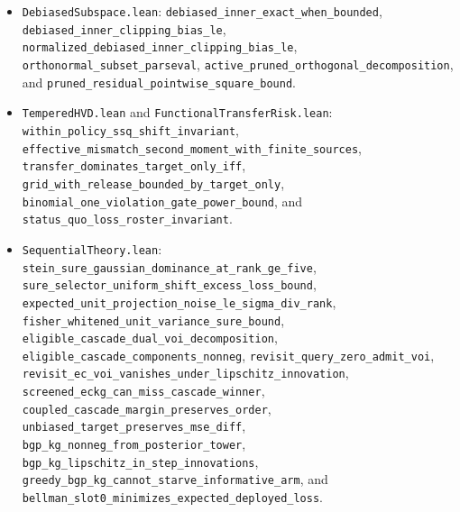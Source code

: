 {\sloppy
\begin{itemize}
  \item \texttt{DebiasedSubspace.lean}: \texttt{debiased\_\allowbreak inner\_\allowbreak exact\_\allowbreak when\_\allowbreak bounded}, \texttt{debiased\_\allowbreak inner\_\allowbreak clipping\_\allowbreak bias\_\allowbreak le}, \texttt{normalized\_\allowbreak debiased\_\allowbreak inner\_\allowbreak clipping\_\allowbreak bias\_\allowbreak le}, \texttt{orthonormal\_\allowbreak subset\_\allowbreak parseval}, \texttt{active\_\allowbreak pruned\_\allowbreak orthogonal\_\allowbreak decomposition}, and \texttt{pruned\_\allowbreak residual\_\allowbreak pointwise\_\allowbreak square\_\allowbreak bound}.
  \item \texttt{TemperedHVD.lean} and \texttt{FunctionalTransferRisk.lean}: \texttt{within\_\allowbreak policy\_\allowbreak ssq\_\allowbreak shift\_\allowbreak invariant}, \texttt{effective\_\allowbreak mismatch\_\allowbreak second\_\allowbreak moment\_\allowbreak with\_\allowbreak finite\_\allowbreak sources}, \texttt{transfer\_\allowbreak dominates\_\allowbreak target\_\allowbreak only\_\allowbreak iff}, \texttt{grid\_\allowbreak with\_\allowbreak release\_\allowbreak bounded\_\allowbreak by\_\allowbreak target\_\allowbreak only}, \texttt{binomial\_\allowbreak one\_\allowbreak violation\_\allowbreak gate\_\allowbreak power\_\allowbreak bound}, and \texttt{status\_\allowbreak quo\_\allowbreak loss\_\allowbreak roster\_\allowbreak invariant}.
  \item \texttt{SequentialTheory.lean}: \texttt{stein\_\allowbreak sure\_\allowbreak gaussian\_\allowbreak dominance\_\allowbreak at\_\allowbreak rank\_\allowbreak ge\_\allowbreak five}, \texttt{sure\_\allowbreak selector\_\allowbreak uniform\_\allowbreak shift\_\allowbreak excess\_\allowbreak loss\_\allowbreak bound}, \texttt{expected\_\allowbreak unit\_\allowbreak projection\_\allowbreak noise\_\allowbreak le\_\allowbreak sigma\_\allowbreak div\_\allowbreak rank}, \texttt{fisher\_\allowbreak whitened\_\allowbreak unit\_\allowbreak variance\_\allowbreak sure\_\allowbreak bound}, \texttt{eligible\_\allowbreak cascade\_\allowbreak dual\_\allowbreak voi\_\allowbreak decomposition}, \texttt{eligible\_\allowbreak cascade\_\allowbreak components\_\allowbreak nonneg}, \texttt{revisit\_\allowbreak query\_\allowbreak zero\_\allowbreak admit\_\allowbreak voi}, \texttt{revisit\_\allowbreak ec\_\allowbreak voi\_\allowbreak vanishes\_\allowbreak under\_\allowbreak lipschitz\_\allowbreak innovation}, \texttt{screened\_\allowbreak eckg\_\allowbreak can\_\allowbreak miss\_\allowbreak cascade\_\allowbreak winner}, \texttt{coupled\_\allowbreak cascade\_\allowbreak margin\_\allowbreak preserves\_\allowbreak order}, \texttt{unbiased\_\allowbreak target\_\allowbreak preserves\_\allowbreak mse\_\allowbreak diff}, \texttt{bgp\_\allowbreak kg\_\allowbreak nonneg\_\allowbreak from\_\allowbreak posterior\_\allowbreak tower}, \texttt{bgp\_\allowbreak kg\_\allowbreak lipschitz\_\allowbreak in\_\allowbreak step\_\allowbreak innovations}, \texttt{greedy\_\allowbreak bgp\_\allowbreak kg\_\allowbreak cannot\_\allowbreak starve\_\allowbreak informative\_\allowbreak arm}, and \texttt{bellman\_\allowbreak slot0\_\allowbreak minimizes\_\allowbreak expected\_\allowbreak deployed\_\allowbreak loss}.

\end{itemize}}
